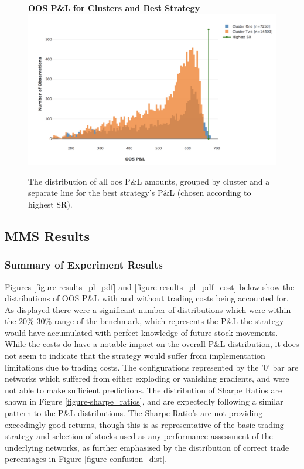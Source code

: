 \documentclass[a4paper,11pt,oneside]{article}
\theoremstyle{plain}
\theoremstyle{definition}
\begin{document}
	\begin{figure}[H]
		\centering
		\textbf{OOS P\&L for Clusters and Best Strategy}
		\includegraphics[scale=0.35]{images/results/dsr/cluster_oos.png} 
		\caption{
			\newline The distribution of all oos P\&L amounts, grouped by cluster and a separate line for the best strategy's P\&L (chosen according to highest SR).}
		\label{figure-dsr_oos}
	\end{figure}
	
	\newpage
	\subsection{MMS Results}\label{results_mms}
	
	
	\subsubsection{Summary of Experiment Results}
	
	Figures \ref{figure-results_pl_pdf} and \ref{figure-results_pl_pdf_cost} below show the distributions of OOS P\&L with and without trading costs being accounted for. As displayed there were a significant number of distributions which were within the 20\%-30\% range of the benchmark, which represents the P\&L the strategy would have accumulated with perfect knowledge of future stock movements. While the costs do have a notable impact on the overall P\&L distribution, it does not seem to indicate that the strategy would suffer from implementation limitations due to trading costs. The configurations represented by the '0' bar are networks which suffered from either exploding or vanishing gradients, and were not able to make sufficient predictions. The distribution of Sharpe Ratios are shown in Figure \ref{figure-sharpe_ratios}, and are expectedly following a similar pattern to the P\&L distributions. The Sharpe Ratio's are not providing exceedingly good returns, though this is as representative of the basic trading strategy and selection of stocks used as any performance assessment of the underlying networks, as further emphasised by the distribution of correct trade percentages in Figure \ref{figure-confusion_dist}. \newline 
	
\end{document}
